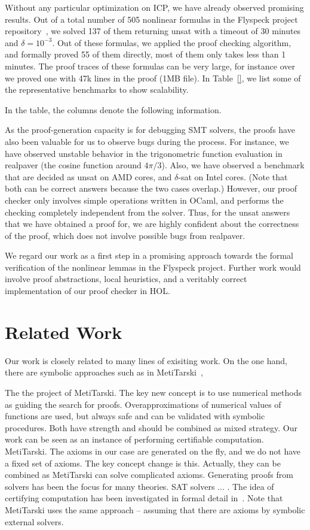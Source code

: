 \documentclass[envcountsect]{llncs}
\begin{document}
Without any particular optimization on ICP, we have already observed promising
results. Out of a total number of 505 nonlinear formulas in the Flyspeck project
repository~\cite{}, we solved 137 of them returning {\sf unsat} with a timeout
of 30 minutes and $\delta=10^{-3}$. Out of these formulas, we applied the proof
checking algorithm, and formally proved 55 of them directly, most of them only
takes less than 1 minutes. The proof traces of these formulas can be very large,
for instance over we proved one with 47k lines in the proof (1MB file). In
Table~\ref{}, we list some of the representative benchmarks to show
scalability. 



In the table, the columns denote the following information. 


As the proof-generation capacity is for debugging SMT solvers, the proofs have
also been valuable for us to observe bugs during the process. For instance, we
have observed unstable behavior in the trigonometric function evaluation in {\sf
realpaver} (the cosine function around $4\pi/3$). Also, we have observed a
benchmark that are decided as {\sf unsat} on AMD cores, and {\sf $\delta$-sat}
on Intel cores. (Note that both can be correct answers because the two cases
overlap.) However, our proof checker only involves simple operations written in
{\sf OCaml}, and performs the checking completely independent from the solver.
Thus, for the {\sf unsat} answers that we have obtained a proof for, we are
highly confident about the correctness of the proof, which does not involve
possible bugs from {\sf realpaver}. 

We regard our work as a first step in a promising approach towards the formal
verification of the nonlinear lemmas in the Flyspeck project. Further work
would involve proof abstractions, local heuristics, and a veritably correct
implementation of our proof checker in HOL. 

\section{Related Work}\label{related}

Our work is closely related to many lines of exisiting
work. On the one hand, there are symbolic approaches such as in
MetiTarski~\cite{},

The the
project of MetiTarski. The key new concept is to use numerical methods as
guiding the search for proofs. Overapproximations of numerical values of
functions are used, but always safe and can be validated with symbolic
procedures. Both have strength and should be combined as mixed strategy. Our
work can be seen as an instance of performing certifiable computation.
MetiTarski. The axioms in our case are generated on the fly, and we do not have
a fixed set of axioms. The key concept change is this. Actually, they can be
combined as MetiTarski can solve
complicated axioms.
Generating proofs from solvers has been the focus for
many theories. SAT solvers ... . The idea of certifying computation has been
investigated in formal detail in~\cite{}. Note that MetiTarski uses the same
approach -- assuming that there are axioms by symbolic external solvers.
\end{document}
